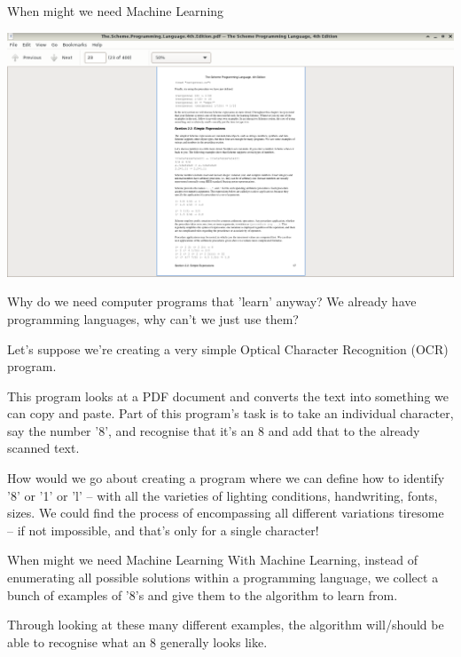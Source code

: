 \documentclass[10pt]{beamer}
\begin{document}
\begin{frame}[label={sec:org70e4b51}]{When might we need Machine Learning}
\begin{center}
\includegraphics[height=0.7\textheight]{images/pdf-ocr.png}
\end{center}

Why do we need computer programs that 'learn' anyway? We already have programming
languages, why can't we just use them?

Let's suppose we're creating a very simple Optical Character Recognition (OCR)
program.

This program looks at a PDF document and converts the text into something we
can copy and paste. Part of this program's task is to take an individual character,
say the number '8', and recognise that it's an 8 and add that to the already scanned
text.

How would we go about creating a program where we can define how to identify '8' or
'1' or 'l' -- with all the varieties of lighting conditions, handwriting, fonts,
sizes. We could find the process of encompassing all different variations tiresome --
if not impossible, and that's only for a single character!
\end{frame}

\begin{frame}[label={sec:org30909dd}]{When might we need Machine Learning}
With Machine Learning, instead of enumerating all possible solutions within a
programming language, we collect a bunch of examples of '8's and give them to the
algorithm to learn from.

Through looking at these many different examples, the algorithm will/should be able
to recognise what an 8 generally looks like.
\end{frame}
\end{document}
